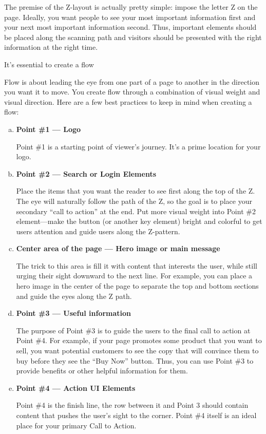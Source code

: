 The premise of the Z-layout is actually pretty simple: impose the letter Z on the page. Ideally, you want people to see your most important information first and your next most important information second. Thus, important elements should be placed along the scanning path and visitors should be presented with the right information at the right time.

It’s essential to create a flow

Flow is about leading the eye from one part of a page to another in the direction you want it to move. You create flow through a combination of visual weight and visual direction. Here are a few best practices to keep in mind when creating a flow:

\begin{enumerate}[(a)]
	\item \textbf{Point \#1 --- Logo} \par Point \#1 is a starting point of viewer’s journey. It’s a prime location for your logo.
	\item \textbf{Point \#2 --- Search or Login Elements} \par Place the items that you want the reader to see first along the top of the Z. The eye will naturally follow the path of the Z, so the goal is to place your secondary ``call to action'' at the end. Put more visual weight into Point \#2 element---make the button (or another key element) bright and colorful to get users attention and guide users along the Z-pattern.
	\item \textbf{Center area of the page --- Hero image or main message} \par The trick to this area is fill it with content that interests the user, while still urging their sight downward to the next line. For example, you can place a hero image in the center of the page to separate the top and bottom sections and guide the eyes along the Z path.
	\item \textbf{Point \#3 --- Useful information} \par The purpose of Point \#3 is to guide the users to the final call to action at Point \#4. For example, if your page promotes some product that you want to sell, you want potential customers to see the copy that will convince them to buy before they see the ``Buy Now'' button. Thus, you can use Point \#3 to provide benefits or other helpful information for them.
	\item \textbf{Point \#4 --- Action UI Elements} \par Point \#4 is the finish line, the row between it and Point 3 should contain content that pushes the user’s sight to the corner. Point \#4 itself is an ideal place for your primary Call to Action.
\end{enumerate}


